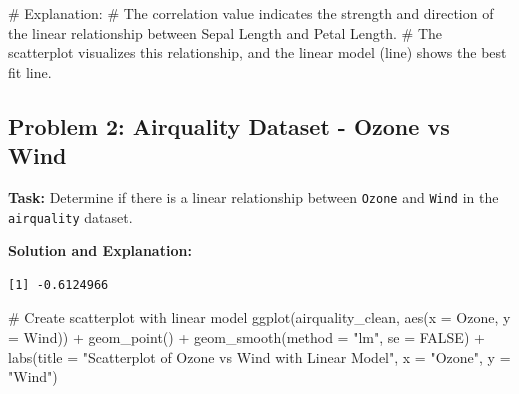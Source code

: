 \documentclass[
  letterpaper,
  DIV=11,
  numbers=noendperiod]{scrreprt}
\newenvironment{Shaded}{\begin{snugshade}}{\end{snugshade}}
\newcommand{\AttributeTok}[1]{\textcolor[rgb]{0.40,0.45,0.13}{#1}}
\newcommand{\CommentTok}[1]{\textcolor[rgb]{0.37,0.37,0.37}{#1}}
\newcommand{\ConstantTok}[1]{\textcolor[rgb]{0.56,0.35,0.01}{#1}}
\newcommand{\FunctionTok}[1]{\textcolor[rgb]{0.28,0.35,0.67}{#1}}
\newcommand{\NormalTok}[1]{\textcolor[rgb]{0.00,0.23,0.31}{#1}}
\newcommand{\OtherTok}[1]{\textcolor[rgb]{0.00,0.23,0.31}{#1}}
\newcommand{\SpecialCharTok}[1]{\textcolor[rgb]{0.37,0.37,0.37}{#1}}
\newcommand{\StringTok}[1]{\textcolor[rgb]{0.13,0.47,0.30}{#1}}
\begin{document}
\begin{Shaded}
\begin{Highlighting}[]
\CommentTok{\# Explanation:}
\CommentTok{\# The correlation value indicates the strength and direction of the linear relationship between Sepal Length and Petal Length.}
\CommentTok{\# The scatterplot visualizes this relationship, and the linear model (line) shows the best fit line.}
\end{Highlighting}
\end{Shaded}

\subsection*{Problem 2: Airquality Dataset - Ozone vs
Wind}\label{problem-2-airquality-dataset---ozone-vs-wind-1}

\textbf{Task:} Determine if there is a linear relationship between
\texttt{Ozone} and \texttt{Wind} in the \texttt{airquality} dataset.

\textbf{Solution and Explanation:}

\begin{Shaded}
\end{Shaded}

\begin{verbatim}
[1] -0.6124966
\end{verbatim}

\begin{Shaded}
\begin{Highlighting}[]
\CommentTok{\# Create scatterplot with linear model}
\FunctionTok{ggplot}\NormalTok{(airquality\_clean, }\FunctionTok{aes}\NormalTok{(}\AttributeTok{x =}\NormalTok{ Ozone, }\AttributeTok{y =}\NormalTok{ Wind)) }\SpecialCharTok{+}
  \FunctionTok{geom\_point}\NormalTok{() }\SpecialCharTok{+}
  \FunctionTok{geom\_smooth}\NormalTok{(}\AttributeTok{method =} \StringTok{"lm"}\NormalTok{, }\AttributeTok{se =} \ConstantTok{FALSE}\NormalTok{) }\SpecialCharTok{+}
  \FunctionTok{labs}\NormalTok{(}\AttributeTok{title =} \StringTok{"Scatterplot of Ozone vs Wind with Linear Model"}\NormalTok{, }\AttributeTok{x =} \StringTok{"Ozone"}\NormalTok{, }\AttributeTok{y =} \StringTok{"Wind"}\NormalTok{)}
\end{Highlighting}
\end{Shaded}
\end{document}
